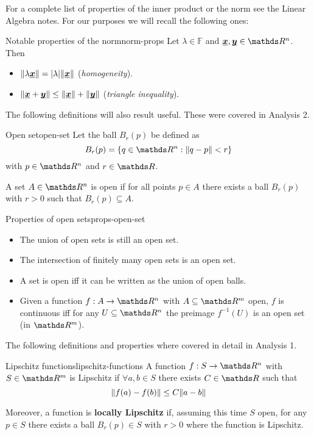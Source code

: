 \documentclass[12pt]{extarticle}
\renewcommand{\vec}[1]{\uvec{#1}}
\begin{document}
For a complete list of properties of the inner product or the norm see the Linear Algebra notes.
For our purposes we will recall the following ones:

\begin{proposition}{Notable properties of the norm}{norm-props}
    Let $\lambda \in \mathbb F$ and $\vec x, \vec y \in \R^n$. Then
    \begin{itemize}
        \item $\norm{\lambda \vec x} = \abs{\lambda}\norm{\vec x}$ (\textit{homogeneity}).
        \item $\norm{\vec x + \vec y} \leq \norm{\vec x} + \norm{\vec y}$ (\textit{triangle inequality}).
    \end{itemize}
\end{proposition}

The following definitions will also result useful. These were covered in Analysis 2.

\begin{definition}{Open set}{open-set}
    Let the ball $B_r(p)$ be defined as
    \begin{equation}
        B_r(p) = \{ q \in \R^n : \norm{q - p} < r \}
    \end{equation}
    with $p \in \R^n$ and $r \in \R$.

    A set $A \in \R^n$ is open if for all points $p \in A$ there exists a ball $B_r(p)$ with $r > 0$ such that $B_r(p) \subseteq A$.
\end{definition}

\begin{proposition}{Properties of open sets}{props-open-set}
    \begin{itemize}
        \item The union of open sets is still an open set.
        \item The intersection of finitely many open sets is an open set.
        \item A set is open iff it can be written as the union of open balls.
        \item Given a function $f:A \to \R^n$ with $A \subseteq \R^m$ open, $f$ is continuous iff for any $U \subseteq \R^n$ the preimage $f^{-1}(U)$ is an open set (in $\R^m$).
    \end{itemize}
\end{proposition}

The following definitions and properties where covered in detail in Analysis 1.

\begin{definition}{Lipschitz functions}{lipschitz-functions}
    A function $f: S \to \R^n$ with $S\in \R^m$ is Lipschitz if $\forall a, b \in S$ there exists $C \in \R$ such that
    \begin{equation}
        \norm{f(a) - f(b)} \leq C \norm{a - b}
    \end{equation}

    Moreover, a function is \textbf{locally Lipschitz} if, assuming this time $S$ open,
    for any $p \in S$ there exists a ball $B_r(p) \in S$ with $r > 0$ where the function is Lipschitz.
\end{definition}
\end{document}

